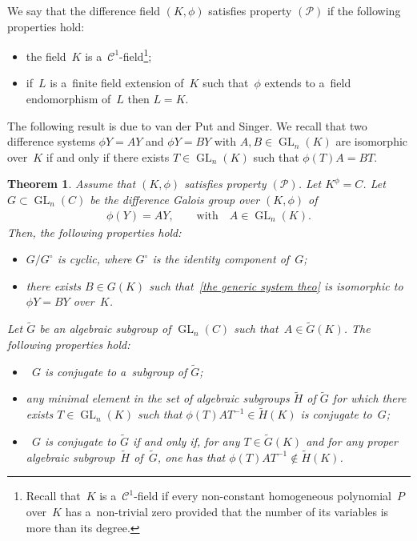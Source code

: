 \documentclass[pdftex]{sigma}
\numberwithin{equation}{section}
\newtheorem{Theorem}{Theorem}[section]
\begin{document}
\begin{Definition}
\label{prop P}
We say that the dif\/ference f\/ield $(K,\phi)$ satisf\/ies property $(\mathcal{P})$ if the following properties hold:
\begin{itemize}\itemsep=0pt
\item the f\/ield~$K$ is a~$\mathcal{C}^{1}$-f\/ield\footnote{Recall that~$K$ is a~$\mathcal{C}^{1}$-f\/ield if every
non-constant homogeneous polynomial~$P$ over~$K$ has a~non-trivial zero provided that the number of its variables is
more than its degree.};
\item if~$L$ is a~f\/inite f\/ield extension of~$K$ such that~$\phi$ extends to a~f\/ield endomorphism of~$L$ then $L=K$.
\end{itemize}
\end{Definition}

The following result is due to van der Put and Singer.
We recall that two dif\/ference systems $\phi Y=AY$ and $\phi Y=BY$ with $A,B \in \operatorname{GL}_{n}(K)$ are isomorphic
over~$K$ if and only if there exists $T \in \operatorname{GL}_{n}(K)$ such that $\phi(T) A=BT$.

\begin{Theorem}
\label{si prop P alors}
Assume that $(K,\phi)$ satisfies property $(\mathcal{P})$.
Let $K^{\phi} = C$.
Let $G \subset \operatorname{GL}_{n}(C)$ be the difference Galois group over $(K,\phi)$ of
\begin{gather}
\label{the generic system theo}
\phi(Y) = AY, \qquad \text{with} \quad  A \in \operatorname{GL}_{n}(K).
\end{gather}
Then, the following properties hold:
\begin{itemize}
\itemsep=0pt
\item $G/G^{\circ}$ is cyclic, where $G^{\circ}$ is the identity component of~$G$;
\item there exists $B \in G(K)$ such that~\eqref{the generic system theo} is isomorphic to $\phi Y=BY$ over~$K$.
\end{itemize}
Let $\widetilde{G}$ be an algebraic subgroup of $\operatorname{GL}_{n}(C)$ such that~$A\in \widetilde{G}(K)$.
The following properties hold:
\begin{itemize}
\itemsep=0pt
\item~$G$ is conjugate to a~subgroup of $\widetilde{G}$;
\item any minimal element in the set of algebraic subgroups $\widetilde{H}$ of $\widetilde{G}$ for which there exists
$T\in \operatorname{GL}_{n}(K)$ such that $\phi(T)AT^{-1}\in \widetilde{H}(K)$ is conjugate to~$G$;
\item~$G$ is conjugate to $\widetilde{G}$ if and only if, for any $T\in \widetilde{G}(K)$ and for any proper algebraic
sub\-group~$\widetilde{H}$ of~$\widetilde{G}$, one has that $\phi(T)AT^{-1}\notin \widetilde{H}(K)$.
\end{itemize}
\end{Theorem}
\end{document}
